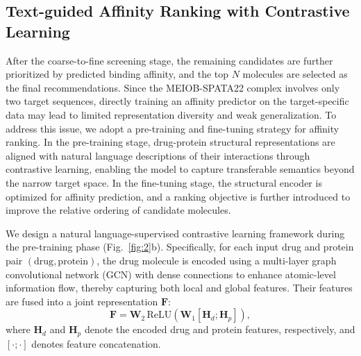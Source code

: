 \documentclass[preprint,12pt]{elsarticle}
\theoremstyle{plain}
\theoremstyle{definition}
\theoremstyle{remark}
\begin{document}
\subsection*{Text-guided Affinity Ranking with Contrastive Learning}

After the coarse-to-fine screening stage, the remaining candidates are further prioritized by predicted binding affinity, and the top $N$ molecules are selected as the final recommendations. Since the MEIOB-SPATA22 complex involves only two target sequences, directly training an affinity predictor on the target-specific data may lead to limited representation diversity and weak generalization. To address this issue, we adopt a pre-training and fine-tuning strategy for affinity ranking. In the pre-training stage, drug-protein structural representations are aligned with natural language descriptions of their interactions through contrastive learning, enabling the model to capture transferable semantics beyond the narrow target space. In the fine-tuning stage, the structural encoder is optimized for affinity prediction, and a ranking objective is further introduced to improve the relative ordering of candidate molecules.





We design a natural language-supervised contrastive learning framework during the pre-training phase (Fig.~\ref{fig:2}b). Specifically, for each input drug and protein pair $(\text{drug},\text{protein})$, the drug molecule is encoded using a multi-layer graph convolutional network (GCN) with dense connections to enhance atomic-level information flow, thereby capturing both local and global features. Their features are fused into a joint representation $\mathbf{F}$:
\begin{equation}
\mathbf{F} = \mathbf{W}_2 \, \mathrm{ReLU}\!\left(\mathbf{W}_1[\mathbf{H}_d;\mathbf{H}_p]\right),
\end{equation}
where $\mathbf{H}_d$ and $\mathbf{H}_p$ denote the encoded drug and protein features, respectively, and $[\cdot;\cdot]$ denotes feature concatenation.
\end{document}
